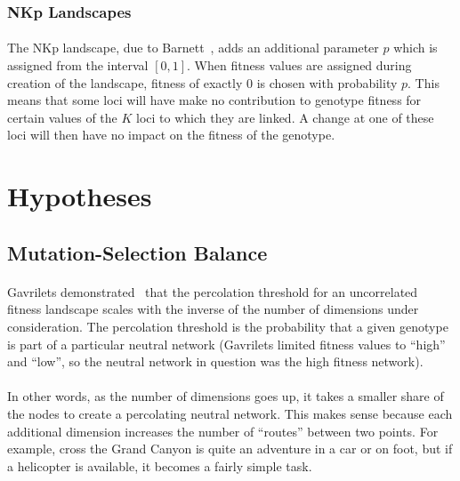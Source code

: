 \documentclass[12pt,letterpaper,titlepage]{article}
\begin{document}
\subsubsection{NKp Landscapes}

\paragraph{}
The NKp landscape, due to Barnett~\cite{Barnett1998}, adds an additional
parameter $p$ which is assigned from the interval $\left[0,1\right]$. When
fitness values are assigned during creation of the landscape, fitness of
exactly 0 is chosen with probability $p$. This means that some loci will have
make no contribution to genotype fitness for certain values of the $K$ loci to
which they are linked. A change at one of these loci will then have no impact
on the fitness of the genotype.

\section{Hypotheses}

\subsection{Mutation-Selection Balance}

\paragraph{}
Gavrilets demonstrated~\cite{Gavrilets1997} that the percolation threshold for
an uncorrelated fitness landscape scales with the inverse of the number of
dimensions under consideration. The percolation threshold is the probability
that a given genotype is part of a particular neutral network (Gavrilets
limited fitness values to ``high'' and ``low'', so the neutral network in
question was the high fitness network).

\paragraph{}
In other words, as the number of dimensions goes up, it takes a smaller share
of the nodes to create a percolating neutral network. This makes sense because
each additional dimension increases the number of ``routes'' between two
points. For example, cross the Grand Canyon is quite an adventure in a car or
on foot, but if a helicopter is available, it becomes a fairly simple task.
\end{document}
